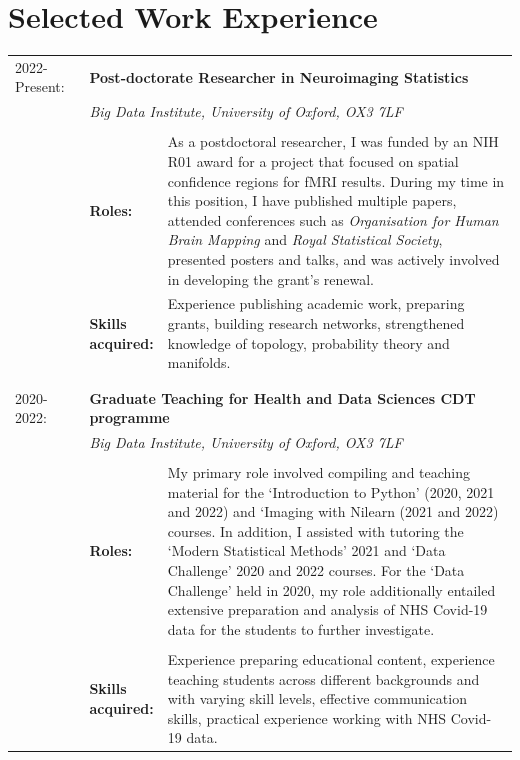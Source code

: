 \documentclass{friggeri-cv}
\begin{document}
\section{Selected Work Experience}



\begin{longtable}{p{0.15\linewidth} p{0.1\linewidth} p{0.75\linewidth}}
     2022-Present: & \multicolumn{2}{p{0.85\linewidth}}{\textbf{Post-doctorate Researcher in Neuroimaging Statistics}} \\
     & \multicolumn{2}{p{0.85\linewidth}}{\textit{Big Data Institute, University of Oxford, OX3 7LF}} \\
     & \\
     & \textbf{Roles:} & As a postdoctoral researcher, I was funded by an NIH R01 award for a project that focused on spatial confidence regions for fMRI results. During my time in this position, I have published multiple papers, attended conferences such as \textit{Organisation for Human Brain Mapping} and \textit{Royal Statistical Society}, presented posters and talks, and was actively involved in developing the grant’s renewal.  
     & \\
     & \textbf{Skills acquired:} & Experience publishing academic work, preparing grants, building research networks, strengthened knowledge of topology, probability theory and manifolds.\\
     & \\
     & \\
     2020-2022: & \multicolumn{2}{p{0.85\linewidth}}{\textbf{Graduate Teaching for Health and Data Sciences CDT programme}} \\
     & \multicolumn{2}{p{0.85\linewidth}}{\textit{Big Data Institute, University of Oxford, OX3 7LF}} \\
     & \\
     & \textbf{Roles:} & My primary role involved compiling and teaching material for the ‘Introduction to Python’ (2020, 2021 and 2022) and `Imaging with Nilearn (2021 and 2022) courses. In addition, I assisted with tutoring the ‘Modern Statistical Methods’ 2021 and ‘Data Challenge’ 2020 and 2022 courses. For the ‘Data Challenge’ held in 2020, my role additionally entailed extensive preparation and analysis of NHS Covid-19 data for the students to further investigate.\\
     & \\
     & \textbf{Skills acquired:} & Experience preparing educational content, experience teaching students across different backgrounds and with varying skill levels, effective communication skills, practical experience working with NHS Covid-19 data. \\

\end{longtable}
\end{document}
